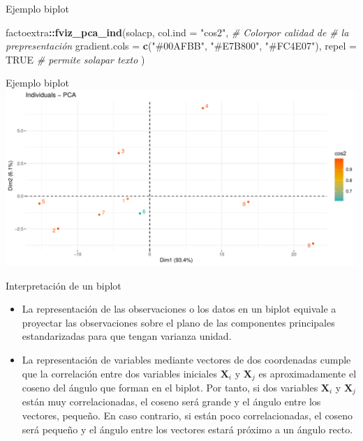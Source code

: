 \documentclass[
  ignorenonframetext,
]{beamer}
\newenvironment{Shaded}{\begin{snugshade}}{\end{snugshade}}
\newcommand{\AttributeTok}[1]{\textcolor[rgb]{0.13,0.29,0.53}{#1}}
\newcommand{\CommentTok}[1]{\textcolor[rgb]{0.56,0.35,0.01}{\textit{#1}}}
\newcommand{\ConstantTok}[1]{\textcolor[rgb]{0.56,0.35,0.01}{#1}}
\newcommand{\FunctionTok}[1]{\textcolor[rgb]{0.13,0.29,0.53}{\textbf{#1}}}
\newcommand{\NormalTok}[1]{#1}
\newcommand{\SpecialCharTok}[1]{\textcolor[rgb]{0.81,0.36,0.00}{\textbf{#1}}}
\newcommand{\StringTok}[1]{\textcolor[rgb]{0.31,0.60,0.02}{#1}}
\providecommand{\tightlist}{%
  \setlength{\itemsep}{0pt}\setlength{\parskip}{0pt}}
\begin{document}
\begin{frame}[fragile]{Ejemplo biplot}
\label{ejemplo-biplot}
\begin{Shaded}
\begin{Highlighting}[]
\NormalTok{factoextra}\SpecialCharTok{::}\FunctionTok{fviz\_pca\_ind}\NormalTok{(solacp,}
             \AttributeTok{col.ind =} \StringTok{"cos2"}\NormalTok{, }
             \CommentTok{\# Colorpor calidad de }
             \CommentTok{\# la prepresentación}
             \AttributeTok{gradient.cols =}
                     \FunctionTok{c}\NormalTok{(}\StringTok{"\#00AFBB"}\NormalTok{, }
                       \StringTok{"\#E7B800"}\NormalTok{, }\StringTok{"\#FC4E07"}\NormalTok{),}
             \AttributeTok{repel =} \ConstantTok{TRUE}
             \CommentTok{\# permite  solapar texto}
\NormalTok{             )}
\end{Highlighting}
\end{Shaded}
\end{frame}

\begin{frame}{Ejemplo biplot}
\label{ejemplo-biplot-1}
\includegraphics{AnalisisComponentesPrincipales_fusion_files/figure-beamer/biplot3-1.pdf}
\end{frame}

\begin{frame}{Interpretación de un biplot}
\label{interpretaciuxf3n-de-un-biplot}
\begin{itemize}
\tightlist
\item
  La representación de las observaciones o los datos en un biplot
  equivale a proyectar las observaciones sobre el plano de las
  componentes principales estandarizadas para que tengan varianza
  unidad.
\item
  La representación de variables mediante vectores de dos coordenadas
  cumple que la correlación entre dos variables iniciales
  \(\mathbf{X}_i\) y \(\mathbf{X}_j\) es aproximadamente el coseno del
  ángulo que forman en el biplot. Por tanto, si dos variables
  \(\mathbf{X}_i\) y \(\mathbf{X}_j\) están muy correlacionadas, el
  coseno será grande y el ángulo entre los vectores, pequeño. En caso
  contrario, si están poco correlacionadas, el coseno será pequeño y el
  ángulo entre los vectores estará próximo a un ángulo recto.
\end{itemize}
\end{frame}
\end{document}
